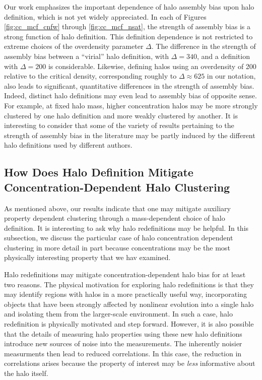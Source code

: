 \documentclass[usenatbib,fleqn]{mnras}
\begin{document}
Our work emphasizes the important dependence of halo assembly bias upon halo definition, which is not yet widely appreciated. In each of Figures \ref{fig:cc_mcf_cnfw} through \ref{fig:cc_mcf_nsat}, the strength of assembly bias is a strong function of halo definition. This definition dependence is not restricted to extreme choices of the overdensity parameter $\Delta$. The difference in the strength of assembly bias between a ``virial'' halo definition, with $\Delta=340$, and a definition with $\Delta=200$ is considerable. Likewise, defining halos using an overdensity of 200 relative to the critical density, corresponding roughly to $\Delta \approx 625$ in our notation, also leads to significant, quantitative differences in the strength of assembly bias. Indeed, distinct halo definitions may even lead to assembly bias of opposite sense. For example, at fixed halo mass, higher concentration halos may be more strongly clustered by one halo definition and more weakly clustered by another. It is interesting to consider that some of the variety of results pertaining to the strength of assembly bias in the literature may be partly induced by the different halo definitions used by different authors.


\subsection{How Does Halo Definition Mitigate Concentration-Dependent Halo Clustering}

As mentioned above, our results indicate that one may mitigate auxiliary 
property dependent clustering through a mass-dependent choice of halo 
definition. It is interesting to ask why halo redefinitions may be 
helpful. In this subsection, we discuss the particular case of halo 
concentration dependent clustering in more detail in part because concentrations may be the most physically interesting property that we 
hav examined.

Halo redefinitions may mitigate concentration-dependent halo bias for at least two reasons. The physical motivation for exploring halo redefinitions is that they may identify regions with halos in a more practically useful way, incorporating objects that have been strongly affected by nonlinear evolution into a single halo and isolating them from the larger-scale environment. In such a case, halo redefinition is physically motivated and step forward. However, it is also possible that the details of measuring halo properties using these new halo definitions introduce new sources of noise into the measurements. The inherently noisier measurments then lead to reduced correlations. In this case, the reduction in correlations arises because the property of interest may be {\em less} informative about the halo itself. 
\end{document}
